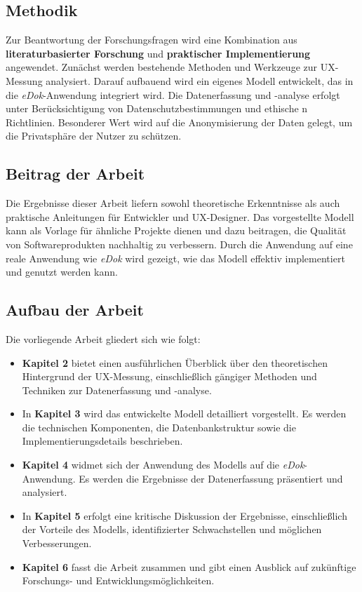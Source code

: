 \documentclass[12pt,oneside]{article}
\begin{document}
\subsection{Methodik}

Zur Beantwortung der Forschungsfragen wird eine Kombination aus \textbf{literaturbasierter Forschung} und \textbf{praktischer Implementierung} angewendet. Zunächst werden bestehende Methoden und Werkzeuge zur UX-Messung analysiert. Darauf aufbauend wird ein eigenes Modell entwickelt, das in die \textit{eDok}-Anwendung integriert wird. Die Datenerfassung und -analyse erfolgt unter Berücksichtigung von Datenschutzbestimmungen und ethische n Richtlinien. Besonderer Wert wird auf die Anonymisierung der Daten gelegt, um die Privatsphäre der Nutzer zu schützen.

\subsection{Beitrag der Arbeit}

Die Ergebnisse dieser Arbeit liefern sowohl theoretische Erkenntnisse als auch praktische Anleitungen für Entwickler und UX-Designer. Das vorgestellte Modell kann als Vorlage für ähnliche Projekte dienen und dazu beitragen, die Qualität von Softwareprodukten nachhaltig zu verbessern. Durch die Anwendung auf eine reale Anwendung wie \textit{eDok} wird gezeigt, wie das Modell effektiv implementiert und genutzt werden kann.

\subsection{Aufbau der Arbeit}

Die vorliegende Arbeit gliedert sich wie folgt:

\begin{itemize} \item \textbf{Kapitel 2} bietet einen ausführlichen Überblick über den theoretischen Hintergrund der UX-Messung, einschließlich gängiger Methoden und Techniken zur Datenerfassung und -analyse. \item In \textbf{Kapitel 3} wird das entwickelte Modell detailliert vorgestellt. Es werden die technischen Komponenten, die Datenbankstruktur sowie die Implementierungsdetails beschrieben. \item \textbf{Kapitel 4} widmet sich der Anwendung des Modells auf die \textit{eDok}-Anwendung. Es werden die Ergebnisse der Datenerfassung präsentiert und analysiert. \item In \textbf{Kapitel 5} erfolgt eine kritische Diskussion der Ergebnisse, einschließlich der Vorteile des Modells, identifizierter Schwachstellen und möglichen Verbesserungen. \item \textbf{Kapitel 6} fasst die Arbeit zusammen und gibt einen Ausblick auf zukünftige Forschungs- und Entwicklungsmöglichkeiten. \end{itemize}
\end{document}
